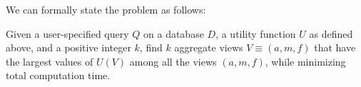 We can formally state the \SeeDB problem as follows:


\begin{problem}
\vspace{-5pt}
Given a user-specified query $Q$ on a database $D$, a utility function $U$ as defined
above, and a positive integer $k$, find $k$ aggregate views $V \equiv (a, m, f)$ that
have the largest values of $U(V)$ among all the views $(a, m, f)$, 
while minimizing total computation time.
\vspace{-5pt}
\end{problem}

